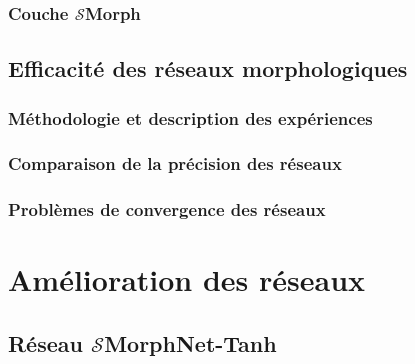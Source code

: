 \documentclass[12pt, twoside, letterpaper, french]{article}
\begin{document}
\subsubsection{Couche $\mathcal{S}$Morph}
\vspace{0.2cm}

\newpage

\subsection{Efficacité des réseaux morphologiques} %

\subsubsection{Méthodologie et description des expériences}
\vspace{0.2cm}

\newpage

\subsubsection{Comparaison de la précision des réseaux}
\vspace{0.2cm}

\newpage

\subsubsection{Problèmes de convergence des réseaux}
\vspace{0.2cm}

\newpage


\section{Amélioration des réseaux}

\subsection{Réseau $\mathcal{S}$MorphNet-Tanh} %
\end{document}
